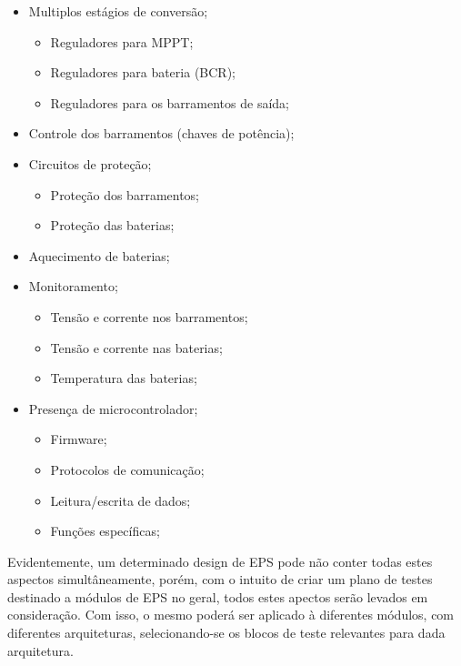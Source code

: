 \begin{itemize}
    \item Multiplos estágios de conversão;
    \begin{itemize}
        \item Reguladores para \gls{MPPT}; %
        \item Reguladores para bateria (\gls{BCR});
        \item Reguladores para os barramentos de saída;
    \end{itemize}
    \item Controle dos barramentos (chaves de potência);
    \item Circuitos de proteção;
    \begin{itemize}
        \item Proteção dos barramentos;
        \item Proteção das baterias;
    \end{itemize}
    \item Aquecimento de baterias;
    \item Monitoramento;
    \begin{itemize}
        \item Tensão e corrente nos barramentos;
        \item Tensão e corrente nas baterias;
        \item Temperatura das baterias;
    \end{itemize}
    \item Presença de microcontrolador;
    \begin{itemize}
        \item Firmware;
        \item Protocolos de comunicação;
        \item Leitura/escrita de dados;
        \item Funções específicas; %
    \end{itemize}
\end{itemize}

Evidentemente, um determinado design de \gls{EPS} pode não conter todas estes aspectos simultâneamente, porém, com o intuito de criar um plano de testes destinado a módulos de \gls{EPS} no geral, todos estes apectos serão levados em consideração. Com isso, o mesmo poderá ser aplicado à diferentes módulos, com diferentes arquiteturas, selecionando-se os blocos de teste relevantes para dada arquitetura.


